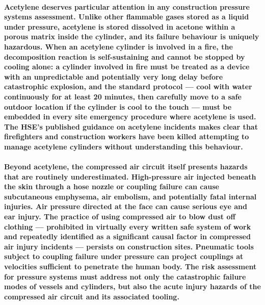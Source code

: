 \paragraph{Acetylene deserves particular attention in any construction pressure systems assessment. Unlike other flammable gases stored as a liquid under pressure, acetylene is stored dissolved in acetone within a porous matrix inside the cylinder, and its failure behaviour is uniquely hazardous. When an acetylene cylinder is involved in a fire, the decomposition reaction is self-sustaining and cannot be stopped by cooling alone: a cylinder involved in fire must be treated as a device with an unpredictable and potentially very long delay before catastrophic explosion, and the standard protocol --- cool with water continuously for at least 20 minutes, then carefully move to a safe outdoor location if the cylinder is cool to the touch --- must be embedded in every site emergency procedure where acetylene is used. The HSE's published guidance on acetylene incidents makes clear that firefighters and construction workers have been killed attempting to manage acetylene cylinders without understanding this behaviour.}

\paragraph{Beyond acetylene, the compressed air circuit itself presents hazards that are routinely underestimated. High-pressure air injected beneath the skin through a hose nozzle or coupling failure can cause subcutaneous emphysema, air embolism, and potentially fatal internal injuries. Air pressure directed at the face can cause serious eye and ear injury. The practice of using compressed air to blow dust off clothing --- prohibited in virtually every written safe system of work and repeatedly identified as a significant causal factor in compressed air injury incidents --- persists on construction sites. Pneumatic tools subject to coupling failure under pressure can project couplings at velocities sufficient to penetrate the human body. The risk assessment for pressure systems must address not only the catastrophic failure modes of vessels and cylinders, but also the acute injury hazards of the compressed air circuit and its associated tooling.}


